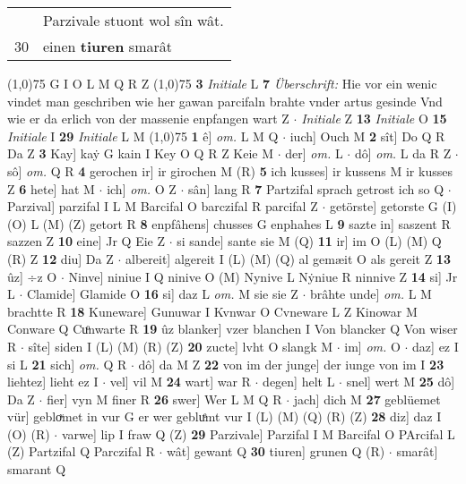 \documentclass[8pt,a4paper,notitlepage]{article}
\begin{document}
\begin{table}[ht]
\begin{minipage}[t]{0.5\linewidth}
\begin{tabular}{rl}
 & Parzivale stuont wol sîn wât.\\ 
30 & einen \textbf{tiuren} smarât\\ 
\end{tabular}
\scriptsize
\line(1,0){75} \newline
G I O L M Q R Z \newline
\line(1,0){75} \newline
\textbf{3} \textit{Initiale} L  \textbf{7} \textit{Überschrift:} Hie vor ein wenic vindet man geschriben wie her gawan parcifaln brahte vnder artus gesinde Vnd wie er da erlich von der massenie enpfangen wart Z   $\cdot$ \textit{Initiale} Z  \textbf{13} \textit{Initiale} O  \textbf{15} \textit{Initiale} I  \textbf{29} \textit{Initiale} L M  \newline
\line(1,0){75} \newline
\textbf{1} ê] \textit{om.} L M Q  $\cdot$ iuch] Ouch M \textbf{2} sît] Do Q R Da Z \textbf{3} Kay] kaẏ G kain I Key O Q R Z Keie M  $\cdot$ der] \textit{om.} L  $\cdot$ dô] \textit{om.} L da R Z  $\cdot$ sô] \textit{om.} Q R \textbf{4} gerochen ir] ir girochen M (R) \textbf{5} ich kusses] ir kussens M ir kusses Z \textbf{6} hete] hat M  $\cdot$ ich] \textit{om.} O Z  $\cdot$ sân] lang R \textbf{7} Partzifal sprach getrost ich so Q  $\cdot$ Parzival] parzifal I L M Barcifal O barczifal R parcifal Z  $\cdot$ getörste] getorste G (I) (O) L (M) (Z) getort R \textbf{8} enpfâhens] chusses G enphahes L \textbf{9} sazte in] saszent R sazzen Z \textbf{10} eine] Jr Q Eie Z  $\cdot$ si sande] sante sie M (Q) \textbf{11} ir] im O (L) (M) Q (R) Z \textbf{12} diu] Da Z  $\cdot$ albereit] algereit I (L) (M) (Q) al gemæit O als gereit Z \textbf{13} ûz] ÷z O  $\cdot$ Ninve] niniue I Q ninive O (M) Nynive L Nẏniue R ninnive Z \textbf{14} si] Jr L  $\cdot$ Clamide] Glamide O \textbf{16} si] daz L \textit{om.} M sie sie Z  $\cdot$ brâhte unde] \textit{om.} L M brachtte R \textbf{18} Kuneware] Gunuwar I Kvnwar O Cvneware L Z Kinowar M Conware Q Cuͦnwarte R \textbf{19} ûz blanker] vzer blanchen I Von blancker Q Von wiser R  $\cdot$ sîte] siden I (L) (M) (R) (Z) \textbf{20} zucte] lvht O slangk M  $\cdot$ im] \textit{om.} O  $\cdot$ daz] ez I si L \textbf{21} sich] \textit{om.} Q R  $\cdot$ dô] da M Z \textbf{22} von im der junge] der iunge von im I \textbf{23} liehtez] lieht ez I  $\cdot$ vel] vil M \textbf{24} wart] war R  $\cdot$ degen] helt L  $\cdot$ snel] wert M \textbf{25} dô] Da Z  $\cdot$ fier] vyn M finer R \textbf{26} swer] Wer L M Q R  $\cdot$ jach] dich M \textbf{27} geblüemet vür] gebloͮmet in vur G er wer gebluͤmt vur I (L) (M) (Q) (R) (Z) \textbf{28} diz] daz I (O) (R)  $\cdot$ varwe] lip I fraw Q (Z) \textbf{29} Parzivale] Parzifal I M Barcifal O PArcifal L (Z) Partzifal Q Parczifal R  $\cdot$ wât] gewant Q \textbf{30} tiuren] grunen Q (R)  $\cdot$ smarât] smarant Q \newline

\end{minipage}
\end{table}
\end{document}
